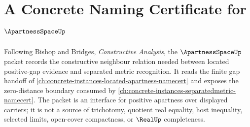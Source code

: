 \chapter{A Concrete Naming Certificate for $\ApartnessSpaceUp$}
\label{ch:concrete-instances-apartnessspace-namecert}

Following Bishop and Bridges, \emph{Constructive Analysis}, the
$\ApartnessSpaceUp$ packet records the constructive neighbour relation needed
between located positive-gap evidence and separated metric recognition. It
reads the finite gap handoff of
\autoref{ch:concrete-instances-located-apartness-namecert} and exposes the
zero-distance boundary consumed by
\autoref{ch:concrete-instances-separatedmetric-namecert}. The packet is an
interface for positive apartness over displayed carriers; it is not a source
of trichotomy, quotient real equality, host inequality, selected limits,
open-cover compactness, or $\RealUp$ completeness.

